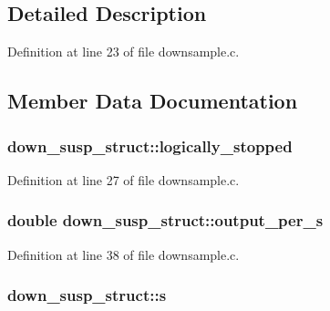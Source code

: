 \subsection{Detailed Description}


Definition at line 23 of file downsample.\+c.



\subsection{Member Data Documentation}
\subsubsection[{\texorpdfstring{logically\+\_\+stopped}{logically_stopped}}]{ down\+\_\+susp\+\_\+struct\+::logically\+\_\+stopped}\hypertarget{structdown__susp__struct_a1c0315f1ab04076b93fdcd5d3c81bbdc}{}\label{structdown__susp__struct_a1c0315f1ab04076b93fdcd5d3c81bbdc}


Definition at line 27 of file downsample.\+c.

\subsubsection[{\texorpdfstring{output\+\_\+per\+\_\+s}{output_per_s}}]{\setlength{\rightskip}{0pt plus 5cm}double down\+\_\+susp\+\_\+struct\+::output\+\_\+per\+\_\+s}\hypertarget{structdown__susp__struct_a4a192b064416ec8b97a4786d1ed46162}{}\label{structdown__susp__struct_a4a192b064416ec8b97a4786d1ed46162}


Definition at line 38 of file downsample.\+c.

\subsubsection[{\texorpdfstring{s}{s}}]{ down\+\_\+susp\+\_\+struct\+::s}\hypertarget{structdown__susp__struct_adf58237768028da5c4def16705c02d98}{}\label{structdown__susp__struct_adf58237768028da5c4def16705c02d98}



